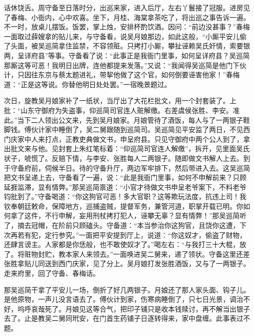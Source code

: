 话休饶舌。周守备至日落时分，出巡来家，进入后厅，左右丫鬟接了冠服。进房见了春梅、小衙内，心中欢喜。坐下，月桂、海棠拿茶吃了，将出巡之事告诉一遍。不一时，放桌儿摆饭。饭罢，掌上烛，安排杯酌饮酒。因问：“前边没甚事？”春梅一面取过薛嫂拿的贴儿来，与守备看，说吴月娘那边，如此这般，“小厮平安儿偷了头面，被吴巡简拿住监禁，不容领赃。只拷打小厮，攀扯诬赖吴氏奸情，索要银两，呈详府县”等事。守备看了说：“此事正是我衙门里事，如何呈详府县？吴巡简那厮这等可恶！我明日出牌，连他都提来发落。”又说：“我闻得吴巡简是他门下伙计，只因往东京与蔡太题进礼，带挈他做了这个官，如何倒要诬害他家！”春梅道：“正是这等说。你替他明日处处罢。”一宿晚景题过。

次日，旋教吴月娘家补了一纸状，当厅出了大花栏批文，用一个封套装了。上批：“山东守御府为失盗事，仰巡简司官连人赃解缴。右差虞侯张胜、李安。准此。”当下二人领出公文来，先到吴月娘家。月娘管待了酒饭，每人与了一两银子鞋脚钱。傅伙计家中睡倒了，吴二舅跟随到巡简司。吴巡简见平安监了两日，不见西门庆家中人来打点，正教吏典做文书，申呈府县。只见守御府中两个公人到了，拿出批文来与他。见封套上朱红笔标着：“仰巡简司官连人解缴”，拆开，见里面吴氏状子，唬慌了。反赔下情，与李安、张胜每人二两银子。随即做文书解人上去。到于守备府前，伺候半日。待的守备升厅，两边军牢排下，然后带进入去。这吴巡简把文书呈递上去，守备看了一遍，说：“此是我衙门里事，如何不申解前来？只顾延捱监滞，显有情弊。”那吴巡简禀道：“小官才待做文书申呈老爷案下，不料老爷钧批到了。”守备喝道：“你这狗官可恶！多大官职？这等欺玩法度，抗违上司！我钦奉朝廷敕命，保障地方，巡捕盗贼，提督军务，兼管河道，职掌开载已明。你如何拿了这件，不行申解，妄用刑杖拷打犯人，诬攀无辜？显有情弊！”那吴巡简听了，摘去冠帽，在阶前只顾磕头。守备道：“本当参治你这狗官，且饶你这遭，下次再若有犯，定行参究。”一面把平安提到厅上，说道：“你这奴才，偷盗了财物，还肆言谤主。人家都是你恁般，也不敢使奴才了。”喝左右：“与我打三十大棍，放了。将赃物封贮，教本家人来领去。”一面唤进吴二舅来，递了领状。守备这里还差张胜拿贴儿同送到西门庆家，见了分上。吴月娘打发张胜酒饭，又与了一两银子。走来府里，回了守备、春梅话。

那吴巡简干拿了平安儿一场，倒折了好几两银子。月娘还了那人家头面、钩子儿。是他原物，一声儿没言语去了。傅伙计到家，伤寒病睡倒了，只七日光景，调治不好，呜呼哀哉死了。月娘见这等合气，把印子铺只是收本钱赎讨，再不解当出银子去了。止是教吴二舅同玳安，在门首生药铺子日逐转得来，家中盘缠。此事表过不题。

